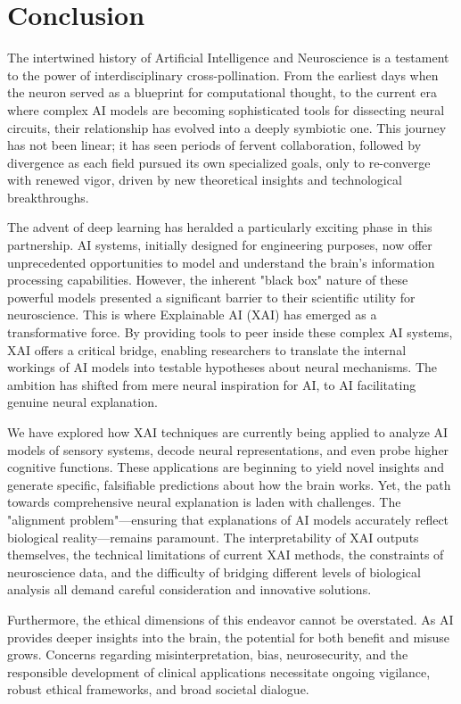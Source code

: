 \documentclass[11pt,a4paper]{article}
\begin{document}
\section{Conclusion}

The intertwined history of Artificial Intelligence and Neuroscience is a testament to the power of interdisciplinary cross-pollination. From the earliest days when the neuron served as a blueprint for computational thought, to the current era where complex AI models are becoming sophisticated tools for dissecting neural circuits, their relationship has evolved into a deeply symbiotic one. This journey has not been linear; it has seen periods of fervent collaboration, followed by divergence as each field pursued its own specialized goals, only to re-converge with renewed vigor, driven by new theoretical insights and technological breakthroughs.

The advent of deep learning has heralded a particularly exciting phase in this partnership. AI systems, initially designed for engineering purposes, now offer unprecedented opportunities to model and understand the brain's information processing capabilities. However, the inherent "black box" nature of these powerful models presented a significant barrier to their scientific utility for neuroscience. This is where Explainable AI (XAI) has emerged as a transformative force. By providing tools to peer inside these complex AI systems, XAI offers a critical bridge, enabling researchers to translate the internal workings of AI models into testable hypotheses about neural mechanisms. The ambition has shifted from mere neural inspiration for AI, to AI facilitating genuine neural explanation.

We have explored how XAI techniques are currently being applied to analyze AI models of sensory systems, decode neural representations, and even probe higher cognitive functions. These applications are beginning to yield novel insights and generate specific, falsifiable predictions about how the brain works. Yet, the path towards comprehensive neural explanation is laden with challenges. The "alignment problem"—ensuring that explanations of AI models accurately reflect biological reality—remains paramount. The interpretability of XAI outputs themselves, the technical limitations of current XAI methods, the constraints of neuroscience data, and the difficulty of bridging different levels of biological analysis all demand careful consideration and innovative solutions.

Furthermore, the ethical dimensions of this endeavor cannot be overstated. As AI provides deeper insights into the brain, the potential for both benefit and misuse grows. Concerns regarding misinterpretation, bias, neurosecurity, and the responsible development of clinical applications necessitate ongoing vigilance, robust ethical frameworks, and broad societal dialogue.
\end{document}
